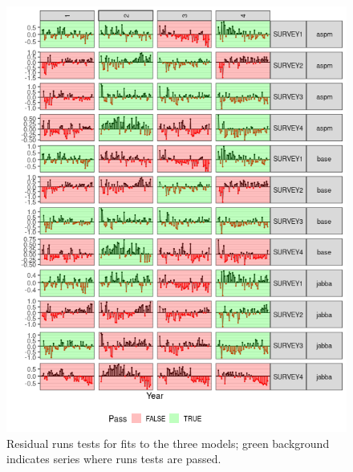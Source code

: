 \documentclass[a4paper]{article}
\begin{document}
\begin{figure}[htbp]
\centering
\includegraphics[width=6in]{final-cpue-residual-runs-1.png}
\caption{Residual runs tests for fits to the three models; green background indicates series where runs tests are passed.}
\label{fig:runs}
\end{figure}
\end{document}
